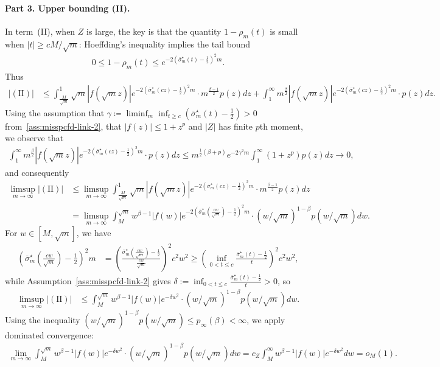 \documentclass[11pt]{article}
\newcommand{\prn}[1]{\left({#1}\right)} %
\newcommand{\wb}[1]{\overline{#1}}
\newcommand{\<}{\langle} %
\renewcommand{\>}{\rangle}
\newcommand{\defeq}{\coloneqq}
\newcommand{\half}{\frac{1}{2}}
\newcommand{\opt}{^\star}
\begin{document}
\paragraph{Part 3. Upper bounding (II).}
In term~(II), when $Z$ is large, the key is that the quantity
$1-\rho_m(t)$ is
small when $|t| \geq cM /\sqrt{m}$: Hoeffding's
inequality implies the tail bound
\begin{align*}
  0 \leq 1 - \rho_m(t) \leq e^{-2 \left(\wb{\sigma}_m\opt(t) - \half\right)^2 m}  .
\end{align*}
Thus
\begin{align}
	|\mathrm{(II)}| &\leq  \int_{\frac{M}{\sqrt m}}^1 \sqrt m |f(\sqrt m z)|  e^{-2\left(\wb{\sigma}_m\opt(cz) - \half\right)^2m}\cdot  m^{\frac{\beta-1}{2}} p(z) dz + \int_{1}^\infty m^{\frac \beta 2} |f(\sqrt m z)|  e^{-2\left(\wb{\sigma}_m\opt(cz) - \half\right)^2m}\cdot  p(z) dz   . \nonumber  
\end{align}
Using the assumption that $\gamma \defeq\liminf_m \inf_{t \geq c}
\prn{\wb{\sigma}_m\opt(t) - \half} > 0$ from~\eqref{ass:misspcfd-link-2},
that $|f(z)| \leq 1 +z^p$ and $|Z|$ has finite $p$th moment, we observe
that
\begin{align*}
	\int_{1}^\infty m^{\frac \beta 2} |f(\sqrt m z)|  e^{-2\left(\wb{\sigma}_m\opt(cz) - \half\right)^2m}\cdot  p(z) dz\leq  m^{\frac{1}{2}(\beta + p)}  e^{-2\gamma^2m} \int_1^\infty (1 + z^p) p(z) dz \to 0  ,
\end{align*}
and consequently
\begin{align*} 
	\limsup_{m \to \infty} |\mathrm{(II)}|  & \leq  \limsup_{m \to \infty} \int_{\frac{M}{\sqrt m}}^1 \sqrt m |f(\sqrt m z)|  e^{-2\left(\wb{\sigma}_m\opt(cz) - \half\right)^2m}\cdot  m^{\frac{\beta-1}{2}} p(z) dz \nonumber \\
	& = \limsup_{m \to \infty}   \int_{M}^{\sqrt{m}}  w^{\beta - 1} |f(w)| e^{-2\left(\wb{\sigma}_m\opt\prn{\frac{cw}{\sqrt m}} - \half\right)^2m} \cdot (w/\sqrt{m})^{1-\beta} p(w/\sqrt{m}) d w   .
\end{align*}
For $w \in [M, \sqrt m]$, we have
\begin{align*}
	\left(\wb{\sigma}_m\opt\prn{\frac{cw}{\sqrt m}} - \half\right)^2m & = \left(\frac{\wb{\sigma}_m\opt\prn{\frac{cw}{\sqrt m}} - \half}{\frac{cw}{\sqrt m}}\right)^2 c^2 w^2 \geq \left(\inf_{0 < t \leq c} \frac{\wb{\sigma}_m\opt(t) - \half}{t}\right)^2 c^2 w^2   ,
\end{align*}
while Assumption~\eqref{ass:misspcfd-link-2} gives $\delta:=\inf_{0 < t \leq c} \frac{\wb{\sigma}_m\opt(t) - \half}{t} > 0$,  so
\begin{align*}
\limsup_{m \to \infty} |\mathrm{(II)}| & \leq \int_{M}^{\sqrt{m}}  w^{\beta - 1} |f(w)| e^{-\delta w^2} \cdot (w/\sqrt{m})^{1-\beta} p(w/\sqrt{m}) d w. %
\end{align*}
Using the inequality
$(w/\sqrt{m})^{1-\beta} p(w/\sqrt{m}) \leq p_\infty(\beta) < \infty$, we
apply dominated convergence:
\begin{align*}
  \lim_{m \to \infty} \int_{M}^{\sqrt{m}}  w^{\beta - 1} |f(w)| e^{-\delta w^2} \cdot (w/\sqrt{m})^{1-\beta} p(w/\sqrt{m}) d w  = c_Z \int_M^\infty  w^{\beta - 1}  |f(w)| e^{-\delta w^2} dw = o_M(1).
\end{align*}
\end{document}
